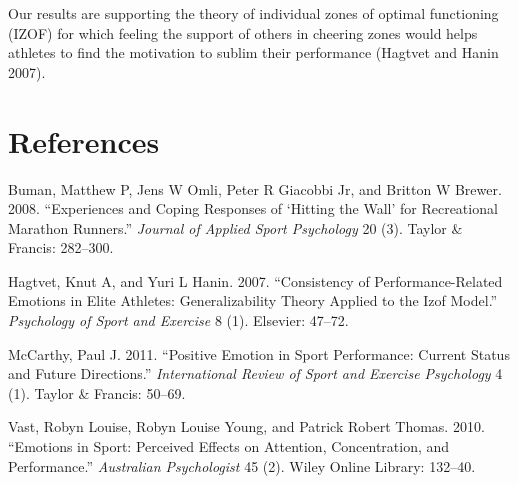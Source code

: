 \documentclass[]{elsarticle} %
\begin{document}
Our results are supporting the theory of individual zones of optimal
functioning (IZOF) for which feeling the support of others in cheering
zones would helps athletes to find the motivation to sublim their
performance (Hagtvet and Hanin 2007).

\section*{References}\label{references}

\hypertarget{refs}{}
\hypertarget{ref-buman2008experiences}{}
Buman, Matthew P, Jens W Omli, Peter R Giacobbi Jr, and Britton W
Brewer. 2008. ``Experiences and Coping Responses of `Hitting the Wall'
for Recreational Marathon Runners.'' \emph{Journal of Applied Sport
Psychology} 20 (3). Taylor \& Francis: 282--300.

\hypertarget{ref-hagtvet2007consistency}{}
Hagtvet, Knut A, and Yuri L Hanin. 2007. ``Consistency of
Performance-Related Emotions in Elite Athletes: Generalizability Theory
Applied to the Izof Model.'' \emph{Psychology of Sport and Exercise} 8
(1). Elsevier: 47--72.

\hypertarget{ref-mccarthy2011positive}{}
McCarthy, Paul J. 2011. ``Positive Emotion in Sport Performance: Current
Status and Future Directions.'' \emph{International Review of Sport and
Exercise Psychology} 4 (1). Taylor \& Francis: 50--69.

\hypertarget{ref-vast2010emotions}{}
Vast, Robyn Louise, Robyn Louise Young, and Patrick Robert Thomas. 2010.
``Emotions in Sport: Perceived Effects on Attention, Concentration, and
Performance.'' \emph{Australian Psychologist} 45 (2). Wiley Online
Library: 132--40.
\end{document}
